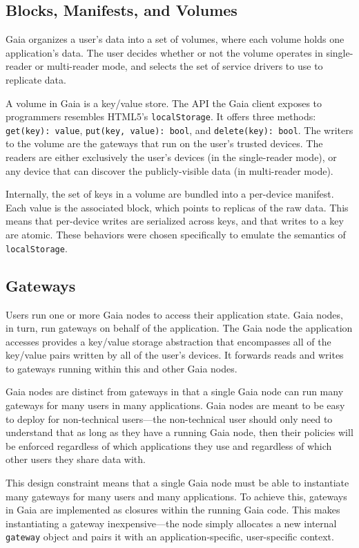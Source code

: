 \subsection{Blocks, Manifests, and Volumes}

Gaia organizes a user's data into a set of volumes, where each volume
holds one application's data.  The user decides whether or not the volume
operates in single-reader or multi-reader mode, and selects the set of
service drivers to use to replicate data.

A volume in Gaia is a key/value store.  The API the Gaia client exposes to
programmers resembles HTML5's \texttt{localStorage}.  It offers three methods:
\texttt{get(key): value}, \texttt{put(key, value): bool}, and
\texttt{delete(key): bool}.  The writers to the volume are the gateways that run
on the user's trusted devices.  The readers are either exclusively the user's
devices (in the single-reader mode), or any device that can discover the
publicly-visible data (in multi-reader mode).

Internally, the set of keys in a volume are bundled into a per-device manifest.
Each value is the associated block, which points to replicas of the raw data.
This means that per-device writes are serialized
across keys, and that writes to a key are atomic.  These behaviors were chosen
specifically to emulate the semantics of \texttt{localStorage}.

\subsection{Gateways}

Users run one or more Gaia nodes to access their application state.  Gaia nodes,
in turn, run gateways on behalf of the application.  The Gaia node the
application accesses provides a key/value storage abstraction that encompasses
all of the key/value pairs written by all of the user's devices.  It forwards
reads and writes to gateways running within this and other Gaia nodes.

Gaia nodes are distinct from gateways in that a single Gaia node can run many
gateways for many users in many applications.  Gaia nodes are meant to be easy
to deploy for non-technical users---the non-technical user should only need to
understand that as long as they have a running Gaia node, then their policies
will be enforced regardless of which applications they use and regardless of
which other users they share data with.

This design constraint means that a
single Gaia node must be able to instantiate many gateways for many users
and many applications.  To achieve this, gateways in Gaia are implemented as
closures within the running Gaia code.  This makes instantiating a gateway
inexpensive---the node simply allocates a new internal \texttt{gateway} object
and pairs it with an application-specific, user-specific context.

